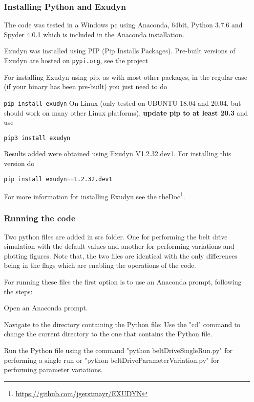 \subsubsection{Installing Python and Exudyn}
\label{installationInstructions}
The code was tested in a Windows pc using Anaconda, 64bit, Python 3.7.6 and Spyder 4.0.1 which is included in the Anaconda installation.

Exudyn was installed using PIP (Pip Installs Packages).
Pre-built versions of Exudyn are hosted on \texttt{pypi.org}, see the project
\bi
 \item {}
\ei
For installing Exudyn using pip, as with most other packages, in the regular case (if your binary has been pre-built) you just need to do
\bi
  \item[] \texttt{pip install exudyn}
\ei
On Linux (only tested on UBUNTU 18.04 and 20.04, but should work on many other Linux platforms), {\bf update pip to at least 20.3} and use 
\bi
  \item[] \texttt{pip3 install exudyn}
\ei

Results added  
were obtained using Exudyn V1.2.32.dev1. For installing this version do
\bi
  \item[] \texttt{pip install exudyn==1.2.32.dev1}
\ei
             
For more information for installing Exudyn see the theDoc\footnote{\url{https://github.com/jgerstmayr/EXUDYN}}.
\subsubsection{Running the code}
Two python files are added in src folder. One for performing the belt drive simulation with the default values and another for performing variations and plotting figures. Note that, the two files are identical with the only differences being in the flags which are enabling the operations of the code.
 
For running these files the first option is to use an Anaconda prompt, following the steps:
\bi
\item Open an Anaconda prompt.
\item Navigate to the directory containing the Python file: Use the "cd" command to change the current directory to the one that contains the Python file.
\item Run the Python file using the command "python beltDriveSingleRun.py" for performing a single run or "python beltDriveParameterVariation.py" for performing parameter variations. 
\ei

